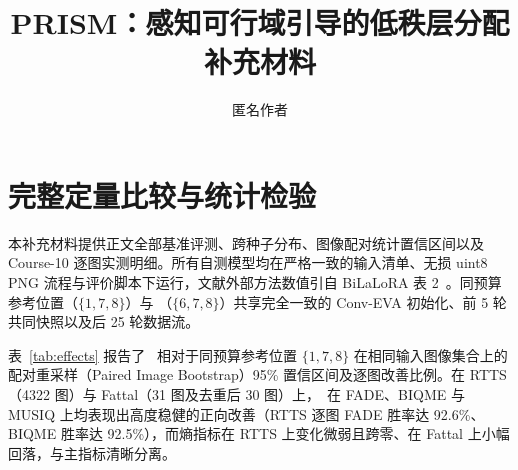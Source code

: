 \documentclass[10pt,twocolumn,letterpaper]{article}
\title{PRISM：感知可行域引导的低秩层分配\\补充材料}
\author{匿名作者}
\begin{document}
\onecolumn\maketitle
\section{完整定量比较与统计检验}
本补充材料提供正文全部基准评测、跨种子分布、图像配对统计置信区间以及 Course-10 逐图实测明细。所有自测模型均在严格一致的输入清单、无损 uint8 PNG 流程与评价脚本下运行，文献外部方法数值引自 BiLaLoRA 表 2~\cite{bilalora2026}。同预算参考位置（$\{1,7,8\}$）与 \method（$\{6,7,8\}$）共享完全一致的 Conv-EVA 初始化、前 5 轮共同快照以及后 25 轮数据流。

\begin{table}[H]\centering\small\setlength{\tabcolsep}{2pt}

\caption{完整 20 行主表对比与辅助 RGB 联合熵列。$\dagger$ 为文献报告值，最后两行为三种子均值（标准差及逐种子分解见正文表 1 与表~\ref{tab:seeds}）。自测数据中 FADE、BIQME 与熵保留 4 位小数，MUSIQ 保留 2 位小数。与分别标识列最优与次优，黑白打印亦可通过粗体与下划线清晰辨识。}
\label{tab:full}
\end{table}

\clearpage
{}
表~\ref{tab:effects} 报告了 \method~相对于同预算参考位置 $\{1,7,8\}$ 在相同输入图像集合上的配对重采样（Paired Image Bootstrap）95\% 置信区间及逐图改善比例。在 RTTS（4322 图）与 Fattal（31 图及去重后 30 图）上，\method~在 FADE、BIQME 与 MUSIQ 上均表现出高度稳健的正向改善（RTTS 逐图 FADE 胜率达 92.6\%、BIQME 胜率达 92.5\%），而熵指标在 RTTS 上变化微弱且跨零、在 Fattal 上小幅回落，与主指标清晰分离。

\begin{table}[H]\centering\small\setlength{\tabcolsep}{2pt}

\caption{\method~相对同预算参考位置的配对变化统计。FADE 下降为改善，其余指标上升为改善；逐图改善比例按每幅图、每个匹配种子的有利变化统计，95\% 区间由图像配对重采样计算。}
\label{tab:effects}
\end{table}

\begin{table}[H]\centering\small\setlength{\tabcolsep}{2pt}

\caption{RTTS 与 Fattal 完整评测的逐种子均值。在全部三个独立随机种子内，\method~相对匹配参考位置的 FADE、BIQME 与 MUSIQ 均实现一致的同向提升，且跨种子波动显著收敛。}
\label{tab:seeds}
\end{table}
\end{document}
